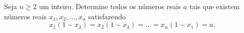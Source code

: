 Seja \(n \ge 2\) um inteiro. Determine todos os números reais \(a\) tais que existem números reais \(x_1,x_2,\dots,x_n\) satisfazendo
\[x_1(1-x_2)=x_2(1-x_3)=\dots=x_n(1-x_1)=a.\]

